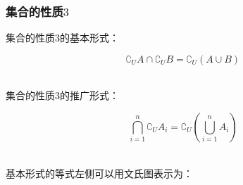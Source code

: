 \documentclass[UTF8]{ctexart}
\begin{document}
\newpage

\subsubsection{集合的性质$3$}
    集合的性质$3$的基本形式：
    \begin{large}
        \begin{equation*}
            \complement_UA\cap\complement_UB=\complement_U\left(A\cup B\right)
        \end{equation*}
    \end{large}\\
    集合的性质$3$的推广形式：
    \begin{large}
        \begin{equation*}
            \bigcap_{i=1}^n \complement_UA_i=\complement_U\left(\bigcup_{i=1}^n A_i\right)
        \end{equation*}
    \end{large}\\[5mm]
    基本形式的等式左侧可以用文氏图表示为：\vspace{5pt}
\end{document}
